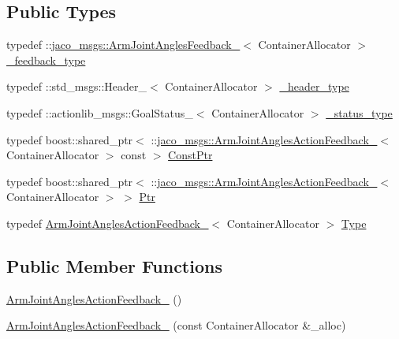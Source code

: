 \subsection*{Public Types}
\begin{DoxyCompactItemize}
\item 
typedef \+::\hyperlink{structjaco__msgs_1_1ArmJointAnglesFeedback__}{jaco\+\_\+msgs\+::\+Arm\+Joint\+Angles\+Feedback\+\_\+}$<$ Container\+Allocator $>$ \hyperlink{structjaco__msgs_1_1ArmJointAnglesActionFeedback___a7256b5b631f5765fd7a67cbd8dfe5b47}{\+\_\+feedback\+\_\+type}
\item 
typedef \+::std\+\_\+msgs\+::\+Header\+\_\+$<$ Container\+Allocator $>$ \hyperlink{structjaco__msgs_1_1ArmJointAnglesActionFeedback___a6607c88f7d652054e5c5295d2b0f2c1d}{\+\_\+header\+\_\+type}
\item 
typedef \+::actionlib\+\_\+msgs\+::\+Goal\+Status\+\_\+$<$ Container\+Allocator $>$ \hyperlink{structjaco__msgs_1_1ArmJointAnglesActionFeedback___aab3ce75e46a0b19c8699b2d683d7bf1d}{\+\_\+status\+\_\+type}
\item 
typedef boost\+::shared\+\_\+ptr$<$ \+::\hyperlink{structjaco__msgs_1_1ArmJointAnglesActionFeedback__}{jaco\+\_\+msgs\+::\+Arm\+Joint\+Angles\+Action\+Feedback\+\_\+}$<$ Container\+Allocator $>$ const  $>$ \hyperlink{structjaco__msgs_1_1ArmJointAnglesActionFeedback___a695a4ffab62a086481b14d1f08475d06}{Const\+Ptr}
\item 
typedef boost\+::shared\+\_\+ptr$<$ \+::\hyperlink{structjaco__msgs_1_1ArmJointAnglesActionFeedback__}{jaco\+\_\+msgs\+::\+Arm\+Joint\+Angles\+Action\+Feedback\+\_\+}$<$ Container\+Allocator $>$ $>$ \hyperlink{structjaco__msgs_1_1ArmJointAnglesActionFeedback___aee3a600e716f11e9662b2ef982c271a6}{Ptr}
\item 
typedef \hyperlink{structjaco__msgs_1_1ArmJointAnglesActionFeedback__}{Arm\+Joint\+Angles\+Action\+Feedback\+\_\+}$<$ Container\+Allocator $>$ \hyperlink{structjaco__msgs_1_1ArmJointAnglesActionFeedback___af4ed900d239fe058855459eb150e621f}{Type}
\end{DoxyCompactItemize}
\subsection*{Public Member Functions}
\begin{DoxyCompactItemize}
\item 
\hyperlink{structjaco__msgs_1_1ArmJointAnglesActionFeedback___ac8dd781b03039cea3467ed197d7cb26b}{Arm\+Joint\+Angles\+Action\+Feedback\+\_\+} ()
\item 
\hyperlink{structjaco__msgs_1_1ArmJointAnglesActionFeedback___a37206c7f17d4545c03855b4c8e15296e}{Arm\+Joint\+Angles\+Action\+Feedback\+\_\+} (const Container\+Allocator \&\+\_\+alloc)
\end{DoxyCompactItemize}
